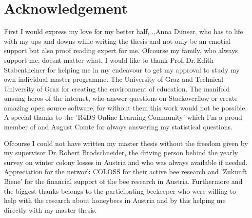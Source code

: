 \chapter*{Acknowledgement}
\label{sec:acknowledgement}
\vspace*{-10mm}

First I would express my love for my better half, \Dr.,Anna Dünser, who has to life with my ups and downs while writing the thesis and not only be an emotial support but also proof reading expert for me. Ofcourse my family, who always support me, doesnt matter what. I would like to thank Prof.\,Dr.\,Edith Stabentheiner for helping me in my endeavour to get my approval to study my own individual master programme. The University of Graz and Technical University of Graz for creating the environment of education. The manifold unsung heros of the internet, who answer questions on Stackoverflow or create amazing open source software, for without them this work would not be possible. A special thanks to the 'R4DS Online Learning Community' which I'm a proud member of and August Comte for always answering my statistical questions.

Ofcourse I could not have written my master thesis without the freedom given by my supervisor Dr.\,Robert Brodschneider, the driving person behind the yearly survey on winter colony losses in Austria and who was always available if needed. Appreciation for the network COLOSS for their active bee research and 'Zukunft Biene' for the financial support of the bee research in Austria. Furthermore and the biggest thanks belongs to the participating beekeeper who were willing to help with the research about honeybees in Austria and by this helping me directly with my master thesis.